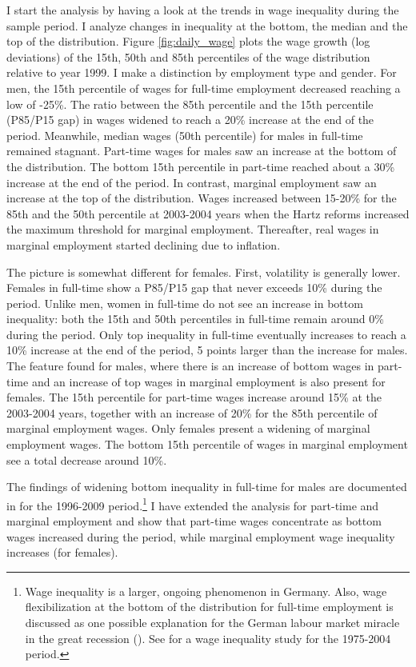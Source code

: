 \documentclass[12pt, a4paper]{article}
\begin{document}
I start the analysis by having a look at the trends in wage inequality during the sample period. I analyze changes in inequality at the bottom, the median and the top of the distribution. Figure \ref{fig:daily_wage} plots the wage growth (log deviations) of the 15th, 50th and 85th percentiles of the wage distribution relative to year 1999. I make a distinction by employment type and gender. For men, the 15th percentile of wages for full-time employment decreased reaching a low of -25\%. The ratio between the 85th percentile and the 15th percentile (P85/P15 gap) in wages widened to reach a 20\% increase at the end of the period. Meanwhile, median wages (50th percentile) for males in full-time remained stagnant. Part-time wages for males saw an increase at the bottom of the distribution. The bottom 15th percentile in part-time reached about a 30\% increase at the end of the period. In contrast, marginal employment saw an increase at the top of the distribution. Wages increased between 15-20\% for the 85th and the 50th percentile at 2003-2004 years when the Hartz reforms increased the maximum threshold for marginal employment. Thereafter, real wages in marginal employment started declining due to inflation.

The picture is somewhat different for females. First, volatility is generally lower. Females in full-time show a P85/P15 gap that never exceeds 10\% during the period. Unlike men, women in full-time do not see an increase in bottom inequality: both the 15th and 50th percentiles in full-time remain around 0\% during the period. Only top inequality in full-time eventually increases to reach a 10\% increase at the end of the period, 5 points larger than the increase for males. The feature found for males, where there is an increase of bottom wages in part-time and an increase of top wages in marginal employment is also present for females. The 15th percentile for part-time wages increase around 15\% at the 2003-2004 years, together with an increase of 20\% for the 85th percentile of marginal employment wages. Only females present a widening of marginal employment wages. The bottom 15th percentile of wages in marginal employment see a total decrease around 10\%.

The findings of widening bottom inequality in full-time for males are documented in \cite{CaHeKl13} for the 1996-2009 period.\footnote{Wage inequality is a larger, ongoing phenomenon in Germany. Also, wage flexibilization at the bottom of the distribution for full-time employment is discussed as one possible explanation for the German labour market miracle in the great recession (\cite{BurdaHunt11}). See \cite{DuLuSc09} for a wage inequality study for the 1975-2004 period.} I have extended the analysis for part-time and marginal employment and show that part-time wages concentrate as bottom wages increased during the period, while marginal employment wage inequality increases (for females).
\end{document}
